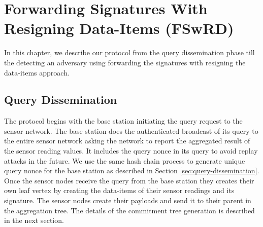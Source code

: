 \chapter{Forwarding Signatures With Resigning Data-Items (FS\lowercase{w}RD)}
	In this chapter, we describe our protocol from the query dissemination phase till the detecting an adversary using forwarding the signatures with resigning the data-items approach.

\section{Query Dissemination}
	The protocol begins with the base station initiating the query request to the sensor network.
	The base station does the authenticated broadcast of its query to the entire sensor network asking the network to report the aggregated result of the sensor reading values.
	It includes the query nonce in its query to avoid replay attacks in the future. 
	We use the same hash chain process to generate unique query nonce for the base station as described in Section \ref{sec:query-dissemination}.
	Once the sensor nodes receive the query from the base station they creates their own leaf vertex by creating the data-items of their sensor readings and its signature.
	The sensor nodes create their payloads and send it to their parent in the aggregation tree. 
	The details of the commitment tree generation is described in the next section.

